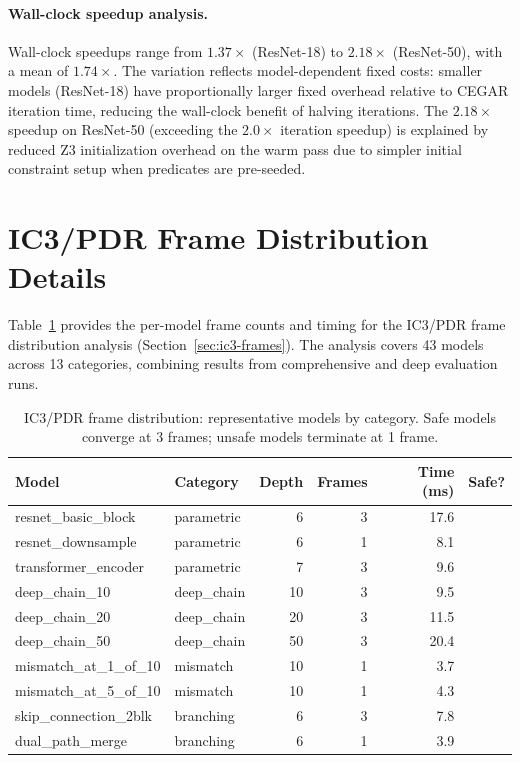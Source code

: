 \documentclass[11pt]{article}
\newcommand{\cmark}{\ding{51}}
\newcommand{\xmark}{\ding{55}}
\begin{document}
\paragraph{Wall-clock speedup analysis.}
Wall-clock speedups range from $1.37\times$ (ResNet-18) to
$2.18\times$ (ResNet-50), with a mean of $1.74\times$.
The variation reflects model-dependent fixed costs: smaller models
(ResNet-18) have proportionally larger fixed overhead relative to
CEGAR iteration time, reducing the wall-clock benefit of halving
iterations.  The $2.18\times$ speedup on ResNet-50 (exceeding the
$2.0\times$ iteration speedup) is explained by reduced Z3
initialization overhead on the warm pass due to simpler initial
constraint setup when predicates are pre-seeded.


\section{IC3/PDR Frame Distribution Details}\label{app:ic3-frame-details}

Table~\ref{tab:ic3-frame-full} provides the per-model frame counts
and timing for the IC3/PDR frame distribution analysis
(Section~\ref{sec:ic3-frames}).  The analysis covers 43 models
across 13 categories, combining results from comprehensive and
deep evaluation runs.

\begin{table}[h]
\centering
\caption{IC3/PDR frame distribution: representative models by category.
  Safe models converge at 3 frames; unsafe models terminate at 1 frame.}
\label{tab:ic3-frame-full}
\small
\begin{tabular}{@{}llrrrr@{}}
\toprule
\textbf{Model} & \textbf{Category} & \textbf{Depth} &
\textbf{Frames} & \textbf{Time (ms)} & \textbf{Safe?} \\
\midrule
resnet\_basic\_block   & parametric     & 6  & 3 & 17.6 & \cmark \\
resnet\_downsample     & parametric     & 6  & 1 &  8.1 & \xmark \\
transformer\_encoder   & parametric     & 7  & 3 &  9.6 & \cmark \\
deep\_chain\_10        & deep\_chain    & 10 & 3 &  9.5 & \cmark \\
deep\_chain\_20        & deep\_chain    & 20 & 3 & 11.5 & \cmark \\
deep\_chain\_50        & deep\_chain    & 50 & 3 & 20.4 & \cmark \\
mismatch\_at\_1\_of\_10  & mismatch     & 10 & 1 &  3.7 & \xmark \\
mismatch\_at\_5\_of\_10  & mismatch     & 10 & 1 &  4.3 & \xmark \\
skip\_connection\_2blk & branching      & 6  & 3 &  7.8 & \cmark \\
dual\_path\_merge      & branching      & 6  & 1 &  3.9 & \xmark \\
\bottomrule
\end{tabular}
\end{table}
\end{document}
